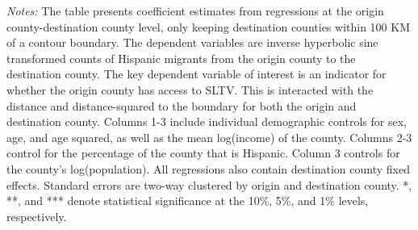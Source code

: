 \begin{table}[!h]
{\begin{threeparttable}
\begin{tablenotes}[flushleft]
				\item \textit{Notes:} The table presents coefficient estimates from regressions at the origin county-destination county level, only keeping destination counties within 100 KM of a contour boundary. The dependent variables are inverse hyperbolic sine transformed counts of Hispanic migrants from the origin county to the destination county. The key dependent variable of interest is an indicator for whether the origin county has access to SLTV. This is interacted with the distance and distance-squared to the boundary for both the origin and destination county. Columns 1-3 include individual demographic controls for sex, age, and age squared, as well as the mean log(income) of the county. Columns 2-3 control for the percentage of the county that is Hispanic. Column 3 controls for the county's log(population). All regressions also contain destination county fixed effects. Standard errors are two-way clustered by origin and destination county. *, **, and *** denote statistical significance at the 10\%, 5\%, and 1\% levels, respectively.
			\end{tablenotes}
		\end{threeparttable}
	}
\end{table}